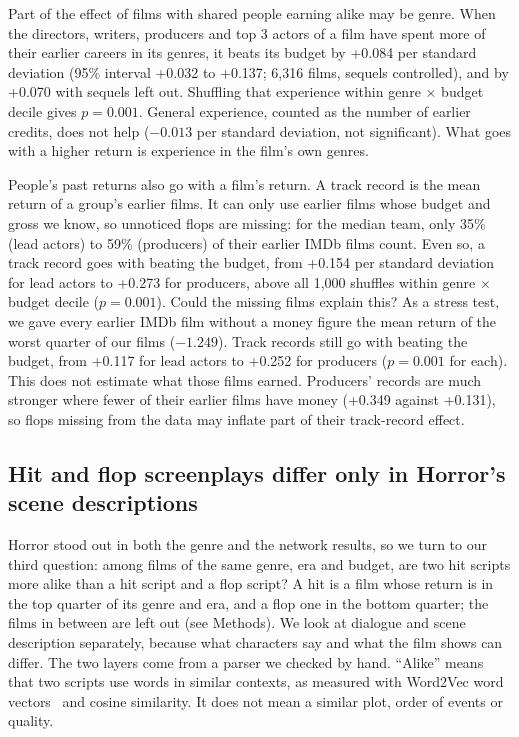 \documentclass[9pt,twocolumn,twoside]{pnas-new}
\begin{document}
Part of the effect of films with shared people earning alike may be genre. When the directors, writers, producers and top 3 actors of a film have spent more of their earlier careers in its genres, it beats its budget by +0.084 per standard deviation (95\% interval +0.032 to +0.137; 6,316 films, sequels controlled), and by +0.070 with sequels left out. Shuffling that experience within genre $\times$ budget decile gives $p=0.001$. General experience, counted as the number of earlier credits, does not help ($-0.013$ per standard deviation, not significant). What goes with a higher return is experience in the film's own genres.

People's past returns also go with a film's return. A track record is the mean return of a group's earlier films. It can only use earlier films whose budget and gross we know, so unnoticed flops are missing: for the median team, only 35\% (lead actors) to 59\% (producers) of their earlier IMDb films count. Even so, a track record goes with beating the budget, from +0.154 per standard deviation for lead actors to +0.273 for producers, above all 1,000 shuffles within genre $\times$ budget decile ($p=0.001$). Could the missing films explain this? As a stress test, we gave every earlier IMDb film without a money figure the mean return of the worst quarter of our films ($-1.249$). Track records still go with beating the budget, from +0.117 for lead actors to +0.252 for producers ($p=0.001$ for each). This does not estimate what those films earned. Producers' records are much stronger where fewer of their earlier films have money (+0.349 against +0.131), so flops missing from the data may inflate part of their track-record effect.

\subsection*{Hit and flop screenplays differ only in Horror's scene descriptions}
Horror stood out in both the genre and the network results, so we turn to our third question: among films of the same genre, era and budget, are two hit scripts more alike than a hit script and a flop script? A hit is a film whose return is in the top quarter of its genre and era, and a flop one in the bottom quarter; the films in between are left out (see Methods).
We look at dialogue and scene description separately, because what characters say and what the film shows can differ. The two layers come from a parser we checked by hand. ``Alike'' means that two scripts use words in similar contexts, as measured with Word2Vec word vectors~\cite{mikolov2013efficient} and cosine similarity. It does not mean a similar plot, order of events or quality.
\end{document}
